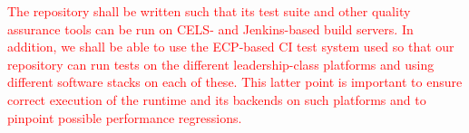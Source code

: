 \documentclass{article}
\begin{document}
\textcolor{red}{
\begin{spec}
The repository shall be written such that its test suite and other quality
assurance tools can be run on CELS- and Jenkins-based build servers.  In
addition, we shall be able to use the ECP-based CI test system used so that our
repository can run tests on the different leadership-class platforms and using
different software stacks on each of these.  This latter point is important to
ensure correct execution of the runtime and its backends on such platforms and
to pinpoint possible performance regressions.
\end{spec}}
\end{document}
